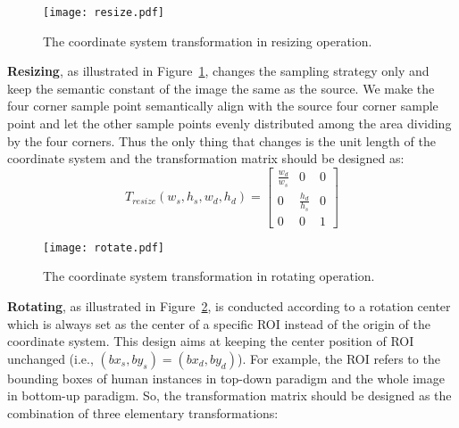 \documentclass[10pt,journal,compsoc]{IEEEtran}
\begin{document}
\begin{figure}[h]
    \centering
    \texttt{[image: resize.pdf]}
    \caption{The coordinate system transformation in resizing operation. }
    \label{fig:resize}
\end{figure}

\textbf{Resizing}, as illustrated in Figure~\ref{fig:resize}, changes the sampling strategy only and keep the semantic constant of the image the same as the source. We make the four corner sample point semantically align with the source four corner sample point and let the other sample points evenly distributed among the area dividing by the four corners. Thus the only thing that changes is the unit length of the coordinate system and the transformation matrix should be designed as:
\begin{equation}
    T_{resize}(w_s,h_s,w_d,h_d) =
    \begin{bmatrix} \frac{w_d}{w_s} & 0 & 0 \\
                    0 & \frac{h_d}{h_s} & 0 \\
                    0 & 0 &1 \end{bmatrix}
\end{equation}

\begin{figure}[h]
    \centering
    \texttt{[image: rotate.pdf]}
    \caption{The coordinate system transformation in rotating operation. }
    \label{fig:rotate}
\end{figure}

\textbf{Rotating}, as illustrated in Figure~\ref{fig:rotate}, is conducted according to a rotation center which is always set as the center of a specific ROI instead of the origin of the coordinate system. This design aims at keeping the center position of ROI unchanged (i.e., $(bx_s,by_s)=(bx_d,by_d)$). For example, the ROI refers to the bounding boxes of human instances in top-down paradigm and the whole image in bottom-up paradigm. So, the transformation matrix should be designed as the combination of three elementary transformations:
\end{document}

